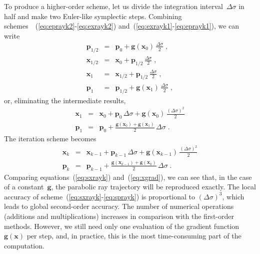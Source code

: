 \documentclass[12pt]{handout}
\begin{document}
To produce a higher-order scheme, let us divide the integration
interval~$\Delta \sigma$ in half and make two Euler-like symplectic steps.
Combining schemes~~(\ref{eq:eprayk2}-\ref{eq:exrayk2})
and~(\ref{eq:exrayk1}-\ref{eq:eprayk1}), we can write
\begin{eqnarray}
  \label{eq:spray1}
  \mathbf{p}_{1/2} & = & \mathbf{p}_0 + 
  \mathbf{g}(\mathbf{x}_{0})\,\frac{\Delta \sigma}{2}\;, \\
  \label{eq:sxray1}  
  \mathbf{x}_{1/2} & = & \mathbf{x}_0 + 
  \mathbf{p}_{1/2}\,\frac{\Delta \sigma}{2}\;, \\
  \label{eq:sxray2}  
  \mathbf{x}_{1} & = & \mathbf{x}_{1/2} + 
  \mathbf{p}_{1/2}\,\frac{\Delta \sigma}{2}\;, \\
  \label{eq:spray1}
  \mathbf{p}_{1} & = & \mathbf{p}_{1/2} + 
  \mathbf{g}(\mathbf{x}_{1})\,\frac{\Delta \sigma}{2}\;,
\end{eqnarray}
or, eliminating the intermediate results,
\begin{eqnarray}
  \label{eq:sxray}  
  \mathbf{x}_{1} & = & \mathbf{x}_{0} + 
  \mathbf{p}_{0}\,\Delta \sigma + \mathbf{g}(\mathbf{x}_{0})\,
  \frac{(\Delta \sigma)^2}{2} \\
  \label{eq:spray}
  \mathbf{p}_{1} & = & \mathbf{p}_0 + 
  \frac{\mathbf{g}(\mathbf{x}_{0})+\mathbf{g}(\mathbf{x}_1)}{2}\,
  \Delta \sigma\;.
\end{eqnarray}
The iteration scheme becomes 
\begin{eqnarray}
  \label{eq:sxrayk}  
  \mathbf{x}_{k} & = & \mathbf{x}_{k-1} + 
  \mathbf{p}_{k-1}\,\Delta \sigma + 
  \mathbf{g}(\mathbf{x}_{k-1})\,\frac{(\Delta \sigma)^2}{2}
  \\
  \label{eq:sprayk}
  \mathbf{p}_{k} & = & \mathbf{p}_{k-1} + 
  \frac{\mathbf{g}(\mathbf{x}_{k-1})+\mathbf{g}(\mathbf{x}_{k})}{2}\,
  \Delta \sigma\;.
\end{eqnarray}
Comparing equations~(\ref{eq:sxrayk}) and~(\ref{eq:xgrad}), we can see
that, in the case of a constant~$\mathbf{g}$, the parabolic ray
trajectory will be reproduced exactly. The local accuracy of
scheme~(\ref{eq:sxrayk}-\ref{eq:sprayk}) is proportional to $(\Delta
\sigma)^3$, which leads to global second-order accuracy. The number of
numerical operations (additions and multiplications) increases in
comparison with the first-order methods. However, we still need only
one evaluation of the gradient function~$\mathbf{g}(\mathbf{x})$ per
step, and, in practice, this is the most time-consuming part of the
computation.
\end{document}
